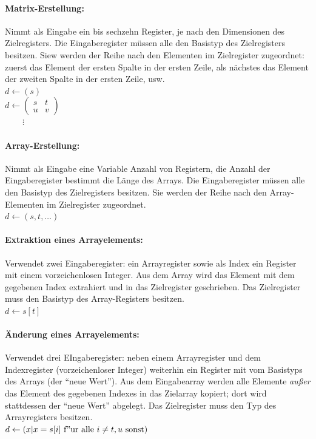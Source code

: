 \documentclass[twoside,a4paper,fleqn,12pt]{article}
\begin{document}
\paragraph{Matrix-Erstellung:} Nimmt als Eingabe ein bis sechzehn Register, je nach den Dimensionen des Zielregisters. Die Eingaberegister müssen alle
den Basistyp des Zielregisters besitzen. Siew werden der Reihe nach den Elementen im Zielregister zugeordnet: zuerst das Element der ersten Spalte in der ersten Zeile,
als nächstes das Element der zweiten Spalte in der ersten Zeile, usw.
\\\hspace*{1cm}$d \gets \left(s\right)$
\\\hspace*{1cm}$d \gets \left(\begin{array}{cc}s&t\\u&v\end{array}\right)$
\\\hspace*{1cm}$\phantom{d \gets}\vdots$

\paragraph{Array-Erstellung:} Nimmt als Eingabe eine Variable Anzahl von Registern, die Anzahl der Eingaberegister bestimmt die Länge des Arrays.
Die Eingaberegister müssen alle den Basistyp des Zielregisters besitzen. Sie werden der Reihe nach den Array-Elementen im Zielregister zugeordnet.
\\\hspace*{1cm}$d \gets (s, t, \dots)$

\paragraph{Extraktion eines Arrayelements:} Verwendet zwei Eingaberegister: ein Arrayregister sowie als Index ein Register mit einem vorzeichenlosen Integer.
Aus dem Array wird das Element mit dem gegebenen Index extrahiert und in das Zielregister geschrieben.
Das Zielregister muss den Basistyp des Array-Registers besitzen.
\\\hspace*{1cm}$d \gets s[t]$

\paragraph{Änderung eines Arrayelements:} Verwendet drei EIngaberegister: neben einem Arrayregister und dem Indexregister (vorzeichenloser Integer)
weiterhin ein Register mit vom Basistyps des Arrays (der "`neue Wert"').
Aus dem Eingabearray werden alle Elemente \emph{außer} das Element des gegebenen Indexes in das Zielarray kopiert;
dort wird stattdessen der "`neue Wert"' abgelegt. Das Zielregister muss den Typ des Arrayregisters besitzen.
\\\hspace*{1cm}$d \gets (x | x = s[i]\ \mathrm{f"ur\ alle}\ i \neq t, u\ \mathrm{sonst})$
\end{document}
